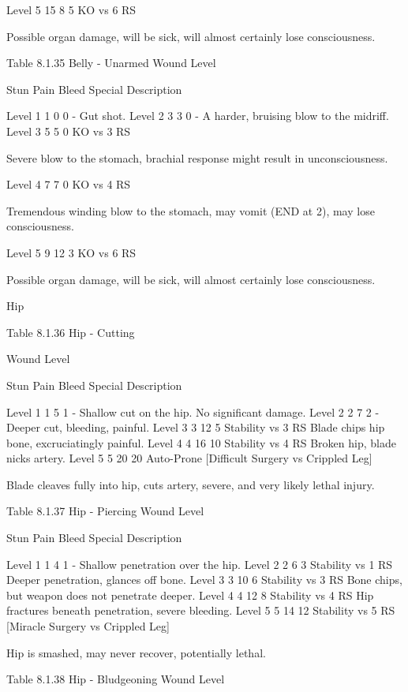 \documentclass[oneside,11pt,english]{book}
\begin{document}
Level 5 15 8 5 KO vs 6 
RS 

Possible organ damage, will be sick, will almost certainly lose 
consciousness. 

 
Table 8.1.35 Belly - Unarmed 
Wound 
Level 

Stun Pain Bleed Special Description 

Level 1 1 0 0 - Gut shot. 
Level 2 3 3 0 - A harder, bruising blow to the midriff. 
Level 3 5 5 0 KO vs 3 
RS 

Severe blow to the stomach, brachial response might result in 
unconsciousness. 

Level 4 7 7 0 KO vs 4 
RS 

Tremendous winding blow to the stomach, may vomit (END at 
2), may lose consciousness. 

Level 5 9 12 3 KO vs 6 
RS 

Possible organ damage, will be sick, will almost certainly lose 
consciousness. 

 

 

Hip 

 
Table 8.1.36 Hip - Cutting 


Wound 
Level 

Stun Pain Bleed Special Description 

Level 1 1 5 1 - Shallow cut on the hip. No significant damage. 
Level 2 2 7 2 - Deeper cut, bleeding, painful. 
Level 3 3 12 5 Stability vs 3 RS Blade chips hip bone, excruciatingly painful. 
Level 4 4 16 10 Stability vs 4 RS Broken hip, blade nicks artery. 
Level 5 5 20 20 Auto-Prone [Difficult 
Surgery vs Crippled Leg] 

Blade cleaves fully into hip, cuts artery, 
severe, and very likely lethal injury. 

 
Table 8.1.37 Hip - Piercing 
Wound 
Level 

Stun Pain Bleed Special Description 

Level 1 1 4 1 - Shallow penetration over the hip. 
Level 2 2 6 3 Stability vs 1 RS Deeper penetration, glances off bone. 
Level 3 3 10 6 Stability vs 3 RS Bone chips, but weapon does not penetrate 
deeper. 
Level 4 4 12 8 Stability vs 4 RS Hip fractures beneath penetration, severe 
bleeding. 
Level 5 5 14 12 Stability vs 5 RS 
[Miracle Surgery vs Crippled 
Leg] 

Hip is smashed, may never recover, 
potentially lethal. 

 
Table 8.1.38 Hip - Bludgeoning 
Wound 
Level 
\end{document}
